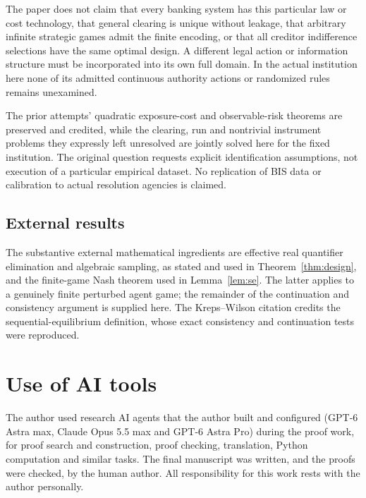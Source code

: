 \documentclass[11pt,a4paper]{article}
\numberwithin{equation}{section}
\theoremstyle{definition}
\begin{document}
The paper does not claim that
every banking system has this particular law or cost technology, that
general clearing is unique without leakage, that arbitrary infinite
strategic games admit the finite encoding, or that all creditor
indifference selections have the same optimal design. A different legal
action or information structure must be incorporated into its own full
domain. In the actual institution here none of its admitted continuous
authority actions or randomized rules remains unexamined.

The prior attempts'
quadratic exposure-cost and observable-risk theorems are preserved
and credited, while the clearing, run and nontrivial instrument problems
they expressly left unresolved are jointly solved here for the fixed
institution.
The original question requests explicit identification assumptions, not
execution of a particular empirical dataset. No replication of BIS data
or calibration to actual resolution agencies is claimed.

\subsection{External results}
The substantive external mathematical ingredients are effective real
quantifier elimination and algebraic sampling, as stated and used in
Theorem~\ref{thm:design}, and the finite-game Nash theorem used in
Lemma~\ref{lem:se}. The latter applies to a genuinely finite
perturbed agent game; the remainder of the continuation and consistency
argument is supplied here. The Kreps--Wilson citation credits the
sequential-equilibrium definition, whose exact consistency and
continuation tests were reproduced.

\section*{Use of AI tools}
The author used research AI agents that the author built and configured (GPT-6 Astra max,
Claude Opus 5.5 max and GPT-6 Astra Pro) during the proof work, for proof search and
construction, proof checking, translation, Python computation and similar tasks. The final
manuscript was written, and the proofs were checked, by the human author. All responsibility
for this work rests with the author personally.
\end{document}
